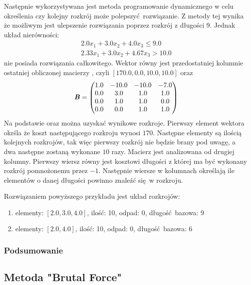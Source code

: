 Następnie wykorzystywana jest metoda programowanie dynamicznego w celu określenia czy kolejny rozkrój może polepszyć rozwiązanie. Z metody tej wynika że możliwym jest ulepszenie rozwiązania poprzez rozkrój z długości 9. Jednak układ nierówności:
\begin{equation*}
  \begin{aligned}
    2.0 x_{1}+ 3.0 x_{2}+ 4.0 x_{3} \le 9.0 \\
    2.33 x_{1}+ 3.0 x_{2}+ 4.67 x_{3} > 10.0
  \end{aligned}
\end{equation*}
nie posiada rozwiązania całkowitego. Wektor  równy jest przedostatniej kolumnie ostatniej obliczonej macierzy , czyli $[170.0,0.0,10.0,10.0]$ oraz
\begin{equation*}
  \textbf{\textit{B}} =
  \begin{pmatrix}
    1.0 & -10.0 & -10.0 & -7.0 \\
    0.0 & 3.0 & 1.0 & 1.0 \\
    0.0 & 1.0 & 1.0 & 0.0 \\
    0.0 & 0.0 & 1.0 & 1.0
  \end{pmatrix}
\end{equation*}
Na podstawie  oraz  można uzyskać wynikowe rozkroje. Pierwszy element wektora  okrśla że koszt następującego rozkroju wynosi $170$. Następne elementy są ilością kolejnych rozkrojów, tak więc pierwszy rozkrój nie będzie brany pod uwagę, a dwa następne zostaną wykonane $10$ razy. Macierz  jest analizowana od drugiej kolumny. Pierwszy wiersz równy jest kosztowi długości z której ma być wykonany rozkrój pomnożonemu przez $-1$. Następnie wiersze w kolumnach określają ile elementów o danej długości powinno znaleźć się w rozkroju.

Rozwiązaniem powyższego przykładu jest układ rozkrojów:
\begin{enumerate}
  \item  elementy: $[2.0,3.0,4.0]$, ilość: 10, odpad: 0, długość bazowa: 9
  \item  elementy: $[2.0,4.0]$, ilość: 10, odpad: 0, długość bazowa: 6
\end{enumerate}
\subsubsection{Podsumowanie}

\subsection{Metoda "Brutal Force"}\label{brutalForce}
